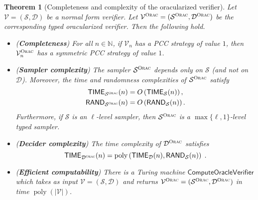 \documentclass[11pt]{article}
\newtheorem{theorem}{Theorem}[section]
\theoremstyle{definition}
\newcommand{\N}{\ensuremath{\mathbb{N}}}
\DeclareMathOperator{\poly}{poly}
\newcommand{\abs}[1]{\left\vert {#1} \right\vert}
\newcommand{\sampler}{\mathcal{S}}
\newcommand{\decider}{\mathcal{D}}
\newcommand{\verifier}{\mathcal{V}}
\newcommand{\gamestyle}[1]{\ensuremath{\textsc{#1}}\xspace}
\newcommand{\ora}{\gamestyle{Orac}}
\newcommand{\TIME}{\mathsf{TIME}}
\newcommand{\RAND}{\mathsf{RAND}}
\newcommand{\tmstyle}[1]{\ensuremath{\mathsf{#1}}}
\newcommand{\ComputeOracleVerifier}{\tmstyle{ComputeOracleVerifier}}
\begin{document}
\begin{theorem}[Completeness and complexity of the oracularized verifier]
  \label{thm:oracle-completeness}
  Let $\verifier = (\sampler, \decider)$ be a normal form verifier.
  Let $\verifier^\ora = (\sampler^\ora,\decider^\ora)$ be the corresponding
  typed oracularized verifier.
  Then the following hold.
  \begin{itemize}
  \item (\textbf{Completeness}) For all $n \in \N$, if $\verifier_n$ has a PCC
    strategy of value $1$, then $\verifier^\ora_n$ has a symmetric
    PCC strategy of value $1$.
  
  \item (\textbf{Sampler complexity}) The sampler $\sampler^\ora$
    depends only on $\sampler$ (and not on $\decider$).
    Moreover, the time and randomness complexities of $\sampler^\ora$
    satisfy
    \begin{equation*}
      \begin{split}
        \TIME_{\sampler^\ora}(n) & = O \left (\TIME_{\sampler}(n)
        \right),\\
        \RAND_{\sampler^\ora}(n) & = O \left (\RAND_{\sampler}(n)
        \right).
      \end{split}
    \end{equation*}
    Furthermore, if $\sampler$ is an $\ell$-level sampler, then
    $\sampler^\ora$ is a $\max\{\ell,1\}$-level typed sampler.

  \item (\textbf{Decider complexity}) The time complexity of $\decider^\ora$
    satisfies
    \begin{equation*}
      \TIME_{\decider^\ora}(n) = \poly \left (\TIME_{\decider}(n),
        \RAND_\sampler(n) \right)\;.
    \end{equation*}

	\item (\textbf{Efficient computability}) There is a Turing machine
    $\ComputeOracleVerifier$ which takes as input $\verifier =
    (\sampler,\decider)$ and returns $\verifier^\ora = ( \sampler^\ora,
    \decider^\ora)$ in time $\poly(\abs{\verifier})$.
  \end{itemize}
\end{theorem}
\end{document}
